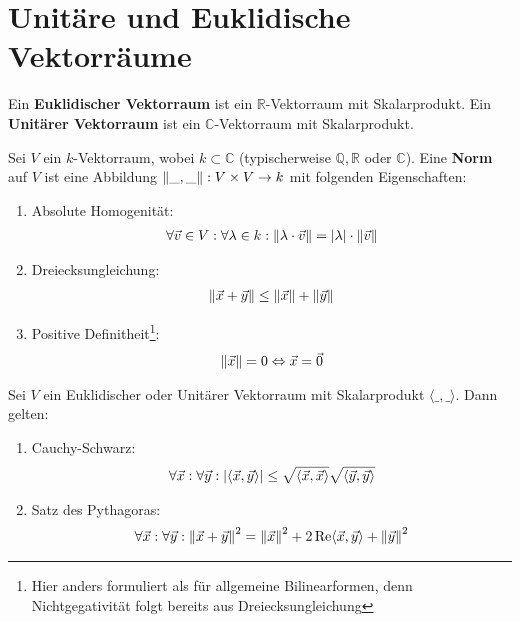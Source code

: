 \documentclass{report}
\newcommand{\tbf}[1]{\textbf{#1}}
\newcommand{\bC}{\mathbb{C}}
\newcommand{\bQ}{\mathbb{Q}}
\newcommand{\bR}{\mathbb{R}}
\newcommand{\vv}{\vec{v}}
\newcommand{\vx}{\vec{x}}
\newcommand{\vy}{\vec{y}}
\newcommand{\vz}{\vec{0}}
\newcommand{\scalar}[2]{\langle #1, #2 \rangle}
\begin{document}
\section{Unitäre und Euklidische Vektorräume}
\begin{definition}
 Ein \tbf{Euklidischer Vektorraum} ist ein $\bR$-Vektorraum mit Skalarprodukt. Ein \tbf{Unitärer Vektorraum} ist ein $\bC$-Vektorraum mit Skalarprodukt.
\end{definition}
\begin{definition}
 Sei $V$ ein $k$-Vektorraum, wobei $k \subset \bC$ (typischerweise $\bQ, \bR$ oder $\bC$). Eine \tbf{Norm} auf $V$ ist eine Abbildung $\norm{\_,\_} : V \times V \to k$ mit folgenden Eigenschaften:
 \begin{enumerate}
  \item Absolute Homogenität:
  \begin{align*}
   \forall \vv \in V : \forall \lambda \in k : \norm{\lambda \cdot \vv} = \abs{\lambda} \cdot \norm{\vv}
  \end{align*}
  \item Dreiecksungleichung:
  \begin{align*}
   \norm{\vx + \vy} \leq \norm{\vx} + \norm{\vy}
  \end{align*}
  \item Positive Definitheit\footnote{Hier anders formuliert als für allgemeine Bilinearformen, denn Nichtgegativität folgt bereits aus Dreiecksungleichung}:
  \begin{align*}
   \norm{\vx} = 0 \Leftrightarrow \vx = \vz
  \end{align*}
 \end{enumerate}
\end{definition}
\begin{beispiel}
 Sei $V$ ein Euklidischer oder Unitärer Vektorraum mit Skalarprodukt $\scalar{\_}{\_}$. Dann gelten:
 \begin{enumerate}
  \item Cauchy-Schwarz:
  \begin{align*}
   \forall \vx : \forall \vy : \abs{\scalar{\vx}{\vy}} \leq \sqrt{\scalar{\vx}{\vx}} \sqrt{\scalar{\vy}{\vy}}
  \end{align*}
  \item Satz des Pythagoras:
  \begin{align*}
   \forall \vx : \forall \vy : \norm{\vx + \vy}^2 = \norm{\vx}^2 + 2 \Re\scalar{\vx}{\vy} + \norm{\vy}^2
  \end{align*}
 \end{enumerate}
\end{beispiel}
\end{document}
